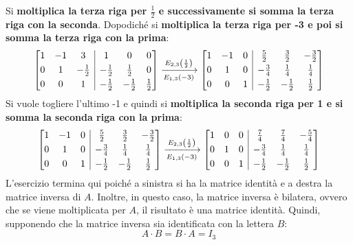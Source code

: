 \documentclass[a4paper]{article}
\makeatletter
\newenvironment{rowequmatbra}[1]{\left[\array{@{}#1@{}}}{\endarray\right]}
\makeatother
\begin{document}
	Si \textbf{moltiplica la terza riga per $\frac{1}{2}$ e successivamente si somma la terza riga con la seconda}. Dopodiché si \textbf{moltiplica la terza riga per -3 e poi si somma la terza riga con la prima}:
	\begin{equation*}
		\begin{rowequmatbra}{ccc|ccc}
			1 & -1 &  3 &  1 & 0 & 0 \\[0.3em]
			0 &  1 & -\frac{1}{2} & -\frac{1}{2} & \frac{1}{2} & 0 \\[0.3em]
			0 &  0 &  1 & -\frac{1}{2} & -\frac{1}{2} & \frac{1}{2}
		\end{rowequmatbra} \xlongrightarrow[E_{1,3}\left(-3\right)]{E_{2,3}\left(\frac{1}{2}\right)}
		\begin{rowequmatbra}{ccc|ccc}
			1 & -1 &  0 &  \frac{5}{2} &  \frac{3}{2} & -\frac{3}{2} \\[0.3em]
			0 &  1 &  0 & -\frac{3}{4} &  \frac{1}{4} &  \frac{1}{4} \\[0.3em]
			0 &  0 &  1 & -\frac{1}{2} & -\frac{1}{2} &  \frac{1}{2}
		\end{rowequmatbra}
	\end{equation*}
	Si vuole togliere l'ultimo -1 e quindi si \textbf{moltiplica la seconda riga per 1 e si somma la seconda riga con la prima}:
	\begin{equation*}
		\begin{rowequmatbra}{ccc|ccc}
			1 & -1 &  0 &  \frac{5}{2} &  \frac{3}{2} & -\frac{3}{2} \\[0.3em]
			0 &  1 &  0 & -\frac{3}{4} &  \frac{1}{4} &  \frac{1}{4} \\[0.3em]
			0 &  0 &  1 & -\frac{1}{2} & -\frac{1}{2} &  \frac{1}{2}
		\end{rowequmatbra} \xlongrightarrow[E_{1,3}\left(-3\right)]{E_{2,3}\left(\frac{1}{2}\right)}
		\begin{rowequmatbra}{ccc|ccc}
			1 &  0 &  0 &  \frac{7}{4} &  \frac{7}{4} & -\frac{5}{4} \\[0.3em]
			0 &  1 &  0 & -\frac{3}{4} &  \frac{1}{4} &  \frac{1}{4} \\[0.3em]
			0 &  0 &  1 & -\frac{1}{2} & -\frac{1}{2} &  \frac{1}{2}
		\end{rowequmatbra}
	\end{equation*}
	L'esercizio termina qui poiché a sinistra si ha la matrice identità e a destra la matrice inversa di $A$. Inoltre, in questo caso, la matrice inversa è bilatera, ovvero che se viene moltiplicata per $A$, il risultato è una matrice identità. Quindi, supponendo che la matrice inversa sia identificata con la lettera $B$:
	\begin{equation*}
		A \cdot B = B \cdot A = I_{3}
	\end{equation*}\newpage
\end{document}
